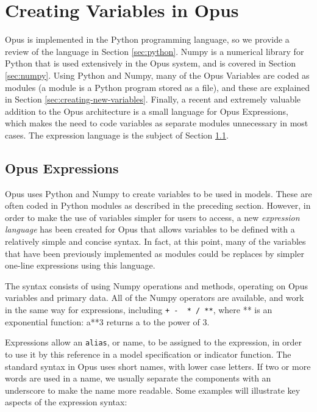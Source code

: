 \chapter{Creating Variables in Opus}
\label{chap:creating-variables}

Opus is implemented in the Python programming language, so we provide
a review of the language in Section \ref{sec:python}. Numpy is a numerical library for Python that is used extensively in the
Opus system, and is covered in Section \ref{sec:numpy}. Using
Python and Numpy, many of the Opus Variables are coded as modules (a module is a Python program stored as a file), and
these are explained in Section \ref{sec:creating-new-variables}.  Finally, a recent
and extremely valuable addition to the Opus architecture is a small
language for Opus Expressions, which makes the need to code variables
as separate modules unnecessary in most cases.  The expression language
is the subject of Section \ref{sec:expressions}.



\section{Opus Expressions}
\label{sec:expressions}

Opus uses Python and Numpy to create variables to be used in models.  These are often coded in Python modules as
described in the preceding section.  However, in order to make the use of variables simpler for users to access, a new
\emph{expression language} has been created for Opus
that allows variables to be defined with a relatively simple and concise syntax.  In fact, at this point, many of the variables that
have been previously implemented as modules could be replaces by simpler one-line expressions using this language.

The syntax consists of using Numpy operations and methods, operating on Opus variables and primary data.  All of the Numpy operators are available, and work in the same way for expressions, including \verb#+ -  * / **#, where ** is an exponential function: a**3 returns a to the power of 3.

Expressions allow an \verb#alias#, or name, to be assigned to the expression, in order to use it by this reference in a model specification or indicator function.  The standard syntax in Opus uses short names, with lower case letters.  If two or more words are used in a name, we usually separate the components with an underscore to make the name more readable.  Some examples will illustrate key aspects of the expression syntax:

